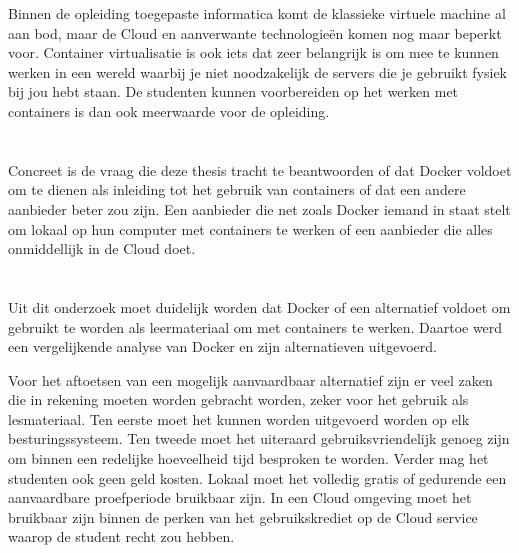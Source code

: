 Binnen de opleiding toegepaste informatica komt de klassieke virtuele machine al aan bod, maar de Cloud en aanverwante technologieën komen nog maar beperkt voor. Container virtualisatie is ook iets dat zeer belangrijk is om mee te kunnen werken in een wereld waarbij je niet noodzakelijk de servers die je gebruikt fysiek bij jou hebt staan. De studenten kunnen voorbereiden op het werken met containers is dan ook meerwaarde voor de opleiding.

\section{}
\label{sec:onderzoeksvraag}

Concreet is de vraag die deze thesis tracht te beantwoorden of dat Docker voldoet om te dienen als inleiding tot het gebruik van containers of dat een andere aanbieder beter zou zijn. Een aanbieder die net zoals Docker iemand in staat stelt om lokaal op hun computer met containers te werken of een aanbieder die alles onmiddellijk in de Cloud doet.

\section{}
\label{sec:onderzoeksdoelstelling}

Uit dit onderzoek moet duidelijk worden dat Docker of een alternatief voldoet om gebruikt te worden als leermateriaal om met containers te werken. Daartoe werd een vergelijkende analyse van Docker en zijn alternatieven uitgevoerd.

Voor het aftoetsen van een mogelijk aanvaardbaar alternatief zijn er veel zaken die in rekening moeten worden gebracht worden, zeker voor het gebruik als lesmateriaal. Ten eerste moet het kunnen worden uitgevoerd worden op elk besturingssysteem. Ten tweede moet het uiteraard gebruiksvriendelijk genoeg zijn om binnen een redelijke hoeveelheid tijd besproken te worden. Verder mag het studenten ook geen geld kosten. Lokaal moet het volledig gratis of gedurende een aanvaardbare proefperiode bruikbaar zijn. In een Cloud omgeving moet het bruikbaar zijn binnen de perken van het gebruikskrediet op de Cloud service waarop de student recht zou hebben.

